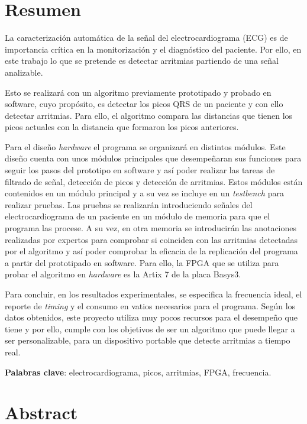 \chapter*{Resumen}

La caracterización automática de la señal del electrocardiograma (ECG) es de importancia crítica en la monitorización y el diagnóstico del paciente. Por ello, en este trabajo lo que se pretende es detectar arritmias partiendo de una señal analizable. 

Esto se realizará con un algoritmo previamente prototipado y probado en software, cuyo propósito, es detectar los picos QRS de un paciente y con ello detectar arritmias. Para ello, el algoritmo compara las distancias que tienen los picos actuales con la distancia que formaron los picos anteriores.

Para el diseño  \textit{hardware}  el programa se organizará en distintos módulos. Este diseño cuenta con unos módulos principales que desempeñaran sus funciones para seguir los pasos del prototipo en software y así poder realizar las tareas de filtrado de señal, detección de picos y detección de arritmias.
Estos módulos están contenidos en un módulo principal y a su vez se incluye en un \textit{testbench} para realizar pruebas. Las pruebas se realizarán introduciendo señales del electrocardiograma de un paciente en un módulo de memoria para que el programa las procese. A su vez, en otra memoria se introducirán las anotaciones realizadas por expertos para comprobar si coinciden con las arritmias detectadas por el algoritmo y así poder comprobar la eficacia de la replicación del programa a partir del prototipado en software. Para ello, la FPGA que se utiliza para probar el algoritmo en \textit{hardware} es la Artix 7 de la placa Basys3.

Para concluir, en los resultados experimentales, se especifica la frecuencia ideal, el reporte de \textit{timing} y el consumo en vatios necesarios para el programa. Según los datos obtenidos, este proyecto utiliza muy pocos recursos para el desempeño que tiene y por ello, cumple con los objetivos de ser un algoritmo que puede llegar a ser personalizable, para un dispositivo portable que detecte arritmias a tiempo real.

\noindent\textbf{Palabras clave}: electrocardiograma, picos, arritmias, FPGA, frecuencia.

\chapter*{Abstract}

